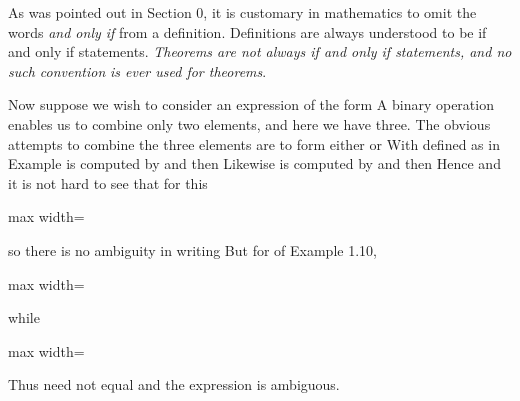 \documentclass[11pt,oneside]{article}
\begin{document}
\begin{BookBody}
As was pointed out in Section 0, it is customary in mathematics to omit the words \textit{and only if} from a definition. Definitions are always understood to be if and only if statements.\textit{ Theorems are not always if and only if statements, and no such convention} \textit{is ever used for theorems}.

Now suppose we wish to consider an expression of the form  A binary operation \BookInline{\ast } enables us to combine only two elements, and here we have three. The obvious attempts to combine the three elements are to form either  or  With \BookInline{\ast } defined as in Example  is computed by  and then  Likewise is computed by  and then  Hence  and it is not hard to see that for this \BookInline{\ast,\allowbreak }

\begin{center}\begin{adjustbox}{max width=\linewidth}\end{adjustbox}\end{center}

\noindent so there is no ambiguity in writing  But for \BookInline{\ast ^{\prime \prime }} of Example 1.10,

\begin{center}\begin{adjustbox}{max width=\linewidth}\end{adjustbox}\end{center}

\noindent while

\begin{center}\begin{adjustbox}{max width=\linewidth}\end{adjustbox}\end{center}

\noindent Thus  need not equal  and the expression  is ambiguous.


\end{BookBody}
\end{document}
